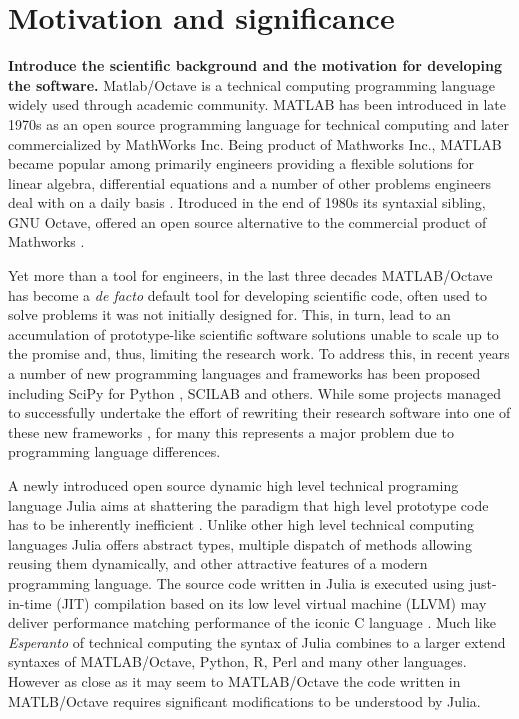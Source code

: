 \section{Motivation and significance}
\label{} 

\textbf{Introduce the scientific background and the motivation for developing the software.}
Matlab/Octave is a technical computing programming language widely used through academic community. MATLAB has been introduced in late 1970s as an open source programming language for technical computing and later commercialized by MathWorks Inc. Being product of Mathworks Inc., MATLAB became popular among primarily engineers providing a flexible solutions for linear algebra, differential equations and a number of other problems engineers deal with on a daily basis \cite{moore2014matlab}. Itroduced in the end of 1980s its syntaxial sibling, GNU Octave, offered an open source alternative to the commercial product of Mathworks \cite{eaton1997gnu}.

Yet more than a tool for engineers, in the last three decades MATLAB/Octave has become a \textit{de facto} default tool for developing scientific code, often used to solve problems it was not initially designed for. This, in turn, lead to an accumulation of prototype-like scientific software solutions unable to scale up to the promise and, thus, limiting the research work. To address this, in recent years a number of new programming languages and frameworks has been proposed including SciPy for Python \cite{jones2001open, Olivier_2002}, SCILAB \cite{Campbell_2009} and others. While some projects managed to successfully undertake the effort of rewriting their research software into one of these new frameworks \cite{17076895, 21349861}, for many this represents a major problem due to programming language differences.

A newly introduced open source dynamic high level technical programing language Julia aims at shattering the paradigm that high level prototype code has to be inherently inefficient \cite{bezanson2012julia, bezanson2014julia}.  Unlike other high level technical computing languages Julia offers abstract types, multiple dispatch of methods allowing reusing them dynamically, and other attractive features of a modern programming language. The source code written in Julia is executed using just-in-time (JIT) compilation based on its low level virtual machine (LLVM) may deliver performance matching performance of the iconic C language \cite{bezanson2012julia, bezanson2014julia}. Much like \textit{Esperanto} of technical computing the syntax of Julia combines to a larger extend syntaxes of MATLAB/Octave, Python, R, Perl and many other languages. However as close as it may seem to MATLAB/Octave the code written in MATLB/Octave requires significant modifications to be understood by Julia.

